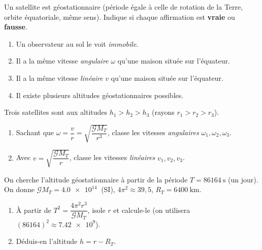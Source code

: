 \documentclass[11pt,a4paper]{article}
\begin{document}

\begin{exo}
Un satellite est géostationnaire (période égale à celle de rotation de la Terre,
orbite équatoriale, même sens). Indique si chaque affirmation est \textbf{vraie} ou
\textbf{fausse}.
\begin{enumerate}[label=\alph*)]
  \item Un observateur au sol le voit \emph{immobile}.
  \item Il a la même vitesse \emph{angulaire} $\omega$ qu'une maison située sur l'équateur.
  \item Il a la même vitesse \emph{linéaire} $v$ qu'une maison située sur l'équateur.
  \item Il existe plusieurs altitudes géostationnaires possibles.
\end{enumerate}
\end{exo}

\begin{exo}
Trois satellites sont aux altitudes $h_1>h_2>h_3$ (rayons $r_1>r_2>r_3$).
\begin{enumerate}[label=\alph*)]
  \item Sachant que $\omega=\dfrac{v}{r}=\sqrt{\dfrac{\mathcal{G}M_T}{r^3}}$, classe les
        vitesses \emph{angulaires} $\omega_1,\omega_2,\omega_3$.
  \item Avec $v=\sqrt{\dfrac{\mathcal{G}M_T}{r}}$, classe les vitesses \emph{linéaires}
        $v_1,v_2,v_3$.
\end{enumerate}
\end{exo}

\begin{exo}
On cherche l'altitude géostationnaire à partir de la période $T=\qty{86164}{\second}$
(un jour). On donne $\mathcal{G}M_T=\qty{4.0e14}{}$ (SI), $4\pi^2\approx 39{,}5$,
$R_T=\qty{6400}{\kilo\metre}$.
\begin{enumerate}[label=\alph*)]
  \item À partir de $T^2=\dfrac{4\pi^2 r^3}{\mathcal{G}M_T}$, isole $r$ et calcule-le
        (on utilisera $(\num{86164})^2\approx\num{7.42e9}$).
  \item Déduis-en l'altitude $h=r-R_T$.
\end{enumerate}
\end{exo}
\end{document}

